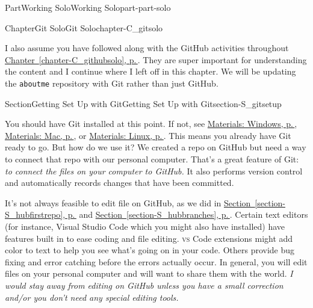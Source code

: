 \documentclass[twoside,10pt,]{book}
\newcommand{\xreffont}{\relax}
\newcommand{\mono}[1]{\texttt{#1}}
\newcommand{\initialism}[1]{\textsc{\MakeLowercase{#1}}}
\begin{document}
\begin{partptx}{Part}{Working Solo}{}{Working Solo}{}{}{part-part-solo}
\begin{chapterptx}{Chapter}{Git Solo}{}{Git Solo}{}{}{chapter-C_gitsolo}
\begin{introduction}{}
I also assume you have followed along with the GitHub activities throughout \hyperref[chapter-C_githubsolo]{Chapter~{\xreffont\ref{chapter-C_githubsolo}}, p.\,\pageref{chapter-C_githubsolo}}. They are super important for understanding the content and I continue where I left off in this chapter. We will be updating the \mono{aboutme} repository with Git rather than just GitHub.%
\end{introduction}%
%
%
\typeout{************************************************}
\typeout{************************************************}
%
\begin{sectionptx}{Section}{Getting Set Up with Git}{}{Getting Set Up with Git}{}{}{section-S_gitsetup}
%
%
\begin{introduction}{}%
You should have Git installed at this point. If not, see \hyperref[preface-materials-windows]{Materials: Windows, p.\,\pageref{preface-materials-windows}}, \hyperref[preface-materials-mac]{Materials: Mac, p.\,\pageref{preface-materials-mac}}, or \hyperref[preface-materials-linux]{Materials: Linux, p.\,\pageref{preface-materials-linux}}. This means you already have Git ready to go. But how do we use it? We created a repo on GitHub but need a way to connect that repo with our personal computer. That's a great feature of Git: \emph{to connect the files on your computer to GitHub.} It also performs version control and automatically records changes that have been committed.%
\par
It's not always feasible to edit file on GitHub, as we did in \hyperref[section-S_hubfirstrepo]{Section~{\xreffont\ref{section-S_hubfirstrepo}}, p.\,\pageref{section-S_hubfirstrepo}} and \hyperref[section-S_hubbranches]{Section~{\xreffont\ref{section-S_hubbranches}}, p.\,\pageref{section-S_hubbranches}}. Certain text editors (for instance, Visual Studio Code which you might also have installed) have features built in to ease coding and file editing. \initialism{VS} Code extensions might add color to text to help you see what's going on in your code. Others provide bug fixing and error catching before the errors actually occur. In general, you will edit files on your personal computer and will want to share them with the world. \emph{I would stay away from editing on GitHub unless you have a small correction and\slash{}or you don't need any special editing tools.}%
\end{introduction}%
%
%
\typeout{************************************************}

\end{sectionptx}
\end{chapterptx}
\end{partptx}
\end{document}
